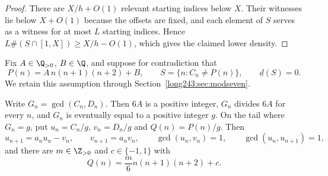 \begin{proof}
There are $X/h+O(1)$ relevant starting indices below $X$. Their witnesses
lie below $X+O(1)$ because the offsets are fixed, and each element of $S$
serves as a witness for at most $L$ starting indices. Hence
$L\#(S\cap[1,X])\ge X/h-O(1)$, which gives the claimed lower density.
\end{proof}

Fix $A\in\Q_{>0}$, $B\in\Q$, and suppose for contradiction that
\[
 P(n)=A\,n(n+1)(n+2)+B,
 \qquad S=\{n:C_n\ne P(n)\},
 \qquad \underline d(S)=0 .
\]
We retain this assumption through Section~\ref{long243:sec:modseven}.

\begin{lemma}\label{long243:res:gcdshape}
Write $G_n=\gcd(C_n,D_n)$.  Then $6A$ is a positive integer, $G_n$ divides
$6A$ for every $n$, and $G_n$ is eventually equal to a positive integer
$g$.  On the tail where $G_n=g$, put $u_n=C_n/g$, $v_n=D_n/g$ and
$Q(n)=P(n)/g$.  Then
\begin{equation}\label{long243:eq:primitivetail}
 u_{n+1}=a_nu_n-v_n,\qquad v_{n+1}=a_nv_n,\qquad \gcd(u_n,v_n)=1,
 \qquad\gcd(u_n,u_{n+1})=1,
\end{equation}
and there are $m\in\Z_{>0}$ and $c\in\{-1,1\}$ with
\begin{equation}\label{long243:eq:Qmc}
 Q(n)=\frac m6n(n+1)(n+2)+c .
\end{equation}
\end{lemma}

